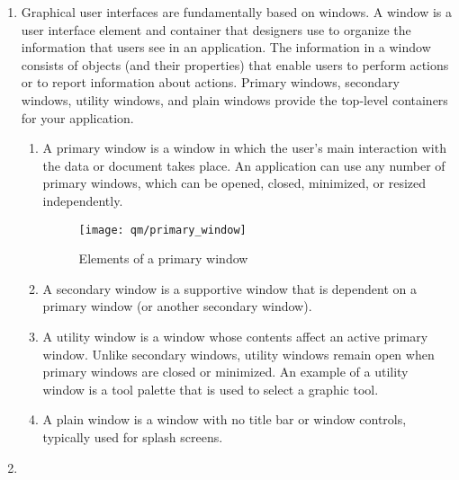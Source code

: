 \begin{enumerate}
\item {}

Graphical user interfaces are fundamentally based on windows.
A window is a user interface element and container that designers use to
organize the information that users see in an application. The information in
a window consists of objects (and their properties) that enable users to
perform actions or to report information about actions. Primary windows,
secondary windows, utility windows, and plain windows provide the top-level
containers for your application.
\newslide
\begin{enumerate}
\item A primary window is a window in which the
user's main interaction with the data or document takes place. An application
can use any number of primary windows, which can be opened, closed, minimized,
or resized independently.
\begin{figure}[H]
\centering
\texttt{[image: qm/primary\_window]}
\caption{Elements of a primary window}
\end{figure}
\item A secondary window is a supportive window that is
dependent on a primary window (or another secondary window).
\item A utility window
is a window whose contents affect an active primary window. Unlike secondary
windows, utility windows remain open when primary windows are closed or
minimized. An example of a utility window is a tool palette that is used to
select a graphic tool.
\item A plain window is a window with no title bar or window
controls, typically used for splash screens.
\end{enumerate}
\newslide
\item {}


\end{enumerate}
